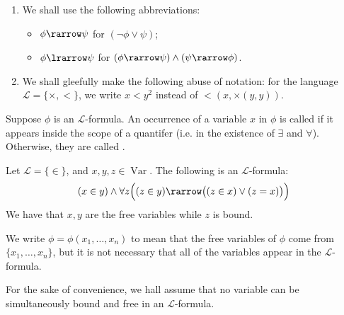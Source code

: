 \documentclass[notoc,notitlepage]{tufte-book}
\DeclareMathOperator{\Var}{Var }
\begin{document}
\begin{remark}
  \begin{enumerate}
    \item We shall use the following abbreviations:
      \begin{itemize}
        \item $\phi \rarrow \psi$ for $(\neg \phi \lor \psi)$;
        \item $\phi \lrarrow \psi$ for $(\phi \rarrow \psi) \land (\psi \rarrow \phi)$.
      \end{itemize}

    \item We shall gleefully make the following abuse of notation: for the language $\mathcal{L} = \{ \times, < \}$, we write $x < y^2$ instead of $< ( x, \times (y, y) )$.
  \end{enumerate}
\end{remark}

\begin{defn}\label{defn:bound_and_free_variables}
  Suppose $\phi$ is an $\mathcal{L}$-formula. An occurrence of a variable $x$ in $\phi$ is called  if it appears inside the scope of a quantifer (i.e. in the existence of $\exists$ and $\forall$). Otherwise, they are called .
\end{defn}

\begin{eg}
  Let $\mathcal{L} = \{ \in \}$, and $x, y, z \in \Var$. The following is an $\mathcal{L}$-formula:
  \begin{equation*}
    (x \in y) \land \forall z \Big( ( z \in y ) \rarrow \big( ( z \in x ) \lor (z = x) \big) \Big)
  \end{equation*}
  We have that $x, y$ are the free variables while $z$ is bound.
\end{eg}

We write $\phi = \phi(x_1, \ldots, x_n)$ to mean that the free variables of $\phi$ come from $\{ x_1, \ldots, x_n \}$, but it is not necessary that all of the variables appear in the $\mathcal{L}$-formula.

For the sake of convenience, we hall assume that no variable can be simultaneously bound and free in an $\mathcal{L}$-formula.



\end{document}
